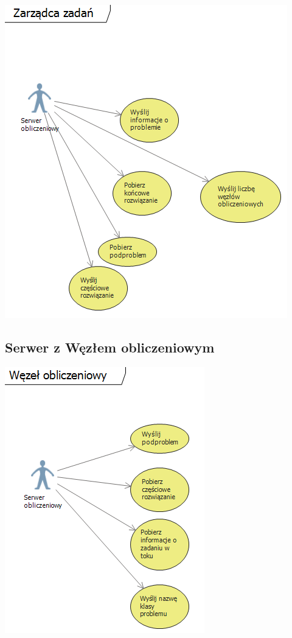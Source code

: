 \documentclass[12pt,a4paper,titlepage]{report}
\begin{document}
			\includegraphics{img/diagram06.png}	
			
			
			\subsection{Serwer z Węzłem obliczeniowym}
			
			\includegraphics{img/diagram07.png}	
			
\end{document}
